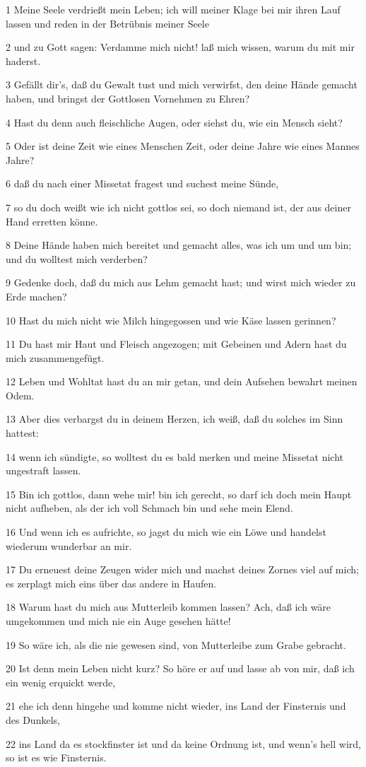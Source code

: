 \par 1 Meine Seele verdrießt mein Leben; ich will meiner Klage bei mir ihren Lauf lassen und reden in der Betrübnis meiner Seele
\par 2 und zu Gott sagen: Verdamme mich nicht! laß mich wissen, warum du mit mir haderst.
\par 3 Gefällt dir's, daß du Gewalt tust und mich verwirfst, den deine Hände gemacht haben, und bringst der Gottlosen Vornehmen zu Ehren?
\par 4 Hast du denn auch fleischliche Augen, oder siehst du, wie ein Mensch sieht?
\par 5 Oder ist deine Zeit wie eines Menschen Zeit, oder deine Jahre wie eines Mannes Jahre?
\par 6 daß du nach einer Missetat fragest und suchest meine Sünde,
\par 7 so du doch weißt wie ich nicht gottlos sei, so doch niemand ist, der aus deiner Hand erretten könne.
\par 8 Deine Hände haben mich bereitet und gemacht alles, was ich um und um bin; und du wolltest mich verderben?
\par 9 Gedenke doch, daß du mich aus Lehm gemacht hast; und wirst mich wieder zu Erde machen?
\par 10 Hast du mich nicht wie Milch hingegossen und wie Käse lassen gerinnen?
\par 11 Du hast mir Haut und Fleisch angezogen; mit Gebeinen und Adern hast du mich zusammengefügt.
\par 12 Leben und Wohltat hast du an mir getan, und dein Aufsehen bewahrt meinen Odem.
\par 13 Aber dies verbargst du in deinem Herzen, ich weiß, daß du solches im Sinn hattest:
\par 14 wenn ich sündigte, so wolltest du es bald merken und meine Missetat nicht ungestraft lassen.
\par 15 Bin ich gottlos, dann wehe mir! bin ich gerecht, so darf ich doch mein Haupt nicht aufheben, als der ich voll Schmach bin und sehe mein Elend.
\par 16 Und wenn ich es aufrichte, so jagst du mich wie ein Löwe und handelst wiederum wunderbar an mir.
\par 17 Du erneuest deine Zeugen wider mich und machst deines Zornes viel auf mich; es zerplagt mich eins über das andere in Haufen.
\par 18 Warum hast du mich aus Mutterleib kommen lassen? Ach, daß ich wäre umgekommen und mich nie ein Auge gesehen hätte!
\par 19 So wäre ich, als die nie gewesen sind, von Mutterleibe zum Grabe gebracht.
\par 20 Ist denn mein Leben nicht kurz? So höre er auf und lasse ab von mir, daß ich ein wenig erquickt werde,
\par 21 ehe ich denn hingehe und komme nicht wieder, ins Land der Finsternis und des Dunkels,
\par 22 ins Land da es stockfinster ist und da keine Ordnung ist, und wenn's hell wird, so ist es wie Finsternis.

